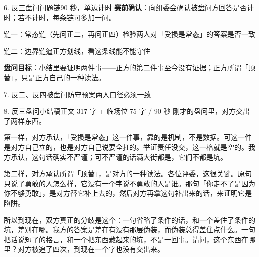 \documentclass[script,con]{debate}
\begin{document}
\begin{stage}{6. 反三盘问问题链}{90 秒，单边计时}
\textbf{赛前确认}：向组委会确认被盘问方回答是否计时；若不计时，每条链可多加一问。
\begin{chain}{链一：常态链（先问正二，再问正四）}{检验两人对「受损是常态」的答案是否一致}
\end{chain}
\begin{chain}{链二：边界链}{逼正方划线，看这条线能不能守住}
\end{chain}
\textbf{盘问目标}：小结里要证明两件事——正方的第二件事至今没有证据；正方所谓「顶替」，只是正方自己的一种读法。
\end{stage}

\begin{stage}{7. 反二、反四被盘问防守预案}{两人口径必须一致}
\begin{qaa}
\end{qaa}
\end{stage}

\begin{speech}{8. 反三盘问小结稿}{正文 317 字 + 临场位 75 字 / 90 秒}
刚才的盘问里，对方交出了两样东西。

第一样，对方承认，「受损是常态」这一件事，靠的是机制，不是数据。可这一件是对方自己立的，也是对方自己说要全扛的。举证责任没交，这一格就是空的。我方承认，这句话确实不严谨；可不严谨的话满大街都是，它们不都是坑。

第二样，对方承认所谓「顶替」，是对方的一种读法。各位评委，这很关键。原句只说了勇敢的人怎么样，它没有一个字说不勇敢的人是谁。那句「你走不了是因为你不够勇敢」，是对方替它补上去的，然后对方再拿这句补出来的话，来证明它是陷阱。

所以到现在，双方真正的分歧是这个：一句省略了条件的话，和一个盖住了条件的坑，差别在哪。我方的答案是差在有没有那层伪装，而伪装总得盖住点什么。一句把话说短了的格言，和一个把东西藏起来的坑，不是一回事。请问，这个东西在哪里？对方被追了四次，到现在一个字也没有交出来。

\end{speech}
\end{document}
